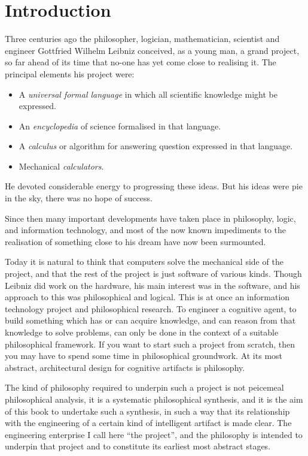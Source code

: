 \def\rbjidintro{$$Id: intro.tex,v 1.9 2011/11/29 16:45:35 rbj Exp $$}
\chapter{Introduction}\label{Introduction}

Three centuries ago the philosopher, logician, mathematician, scientist and engineer Gottfried Wilhelm Leibniz conceived, as a young man, a grand project, so far ahead of its time that no-one has yet come close to realising it.
The principal elements his project were:
\begin{itemize}
\item A \emph{universal formal language} in which all scientific knowledge might be expressed.
\item An \emph{encyclopedia} of science formalised in that language.
\item A \emph{calculus} or algorithm for answering question expressed in that language.
\item Mechanical \emph{calculators}.
\end{itemize}

He devoted considerable energy to progressing these ideas.
But his ideas were pie in the sky, there was no hope of success.

Since then many important developments have taken place in philosophy, logic, and information technology, and most of the now known impediments to the realisation of something close to his dream have now been surmounted.

Today it is natural to think that computers solve the mechanical side of the project, and that the rest of the project is just software of various kinds.
Though Leibniz did work on the hardware, his main interest was in the software, and his approach to this was philosophical and logical.
This is at once an information technology project and philosophical research.
To engineer a cognitive agent, to build something which has or can acquire knowledge, and can reason from that knowledge to solve problems, can only be done in the context of a suitable philosophical framework.
If you want to start such a project from scratch, then you may have to spend some time in philosophical groundwork.
At its most abstract, architectural design for cognitive artifacts is philosophy.

The kind of philosophy required to underpin such a project is not peicemeal philosophical analysis, it is a systematic philosophical synthesis, and it is the aim of this book to undertake such a synthesis, in such a way that its relationship with the engineering of a certain kind of intelligent artifact is made clear.
The engineering enterprise I call here ``the project'', and the philosophy is intended to underpin that project and to constitute its earliest most abstract stages.

